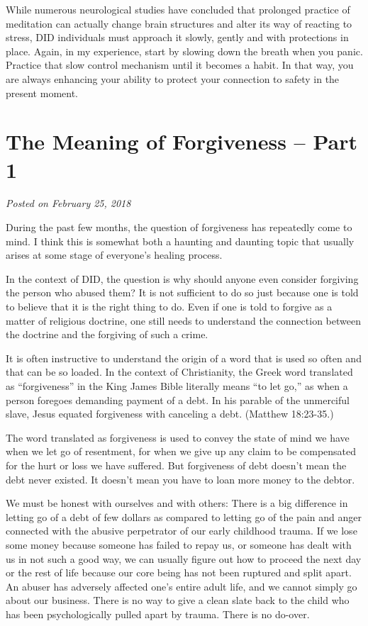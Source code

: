 \documentclass[]{book}
\begin{document}
While numerous neurological studies have concluded that prolonged practice of meditation can actually change brain structures and alter its way of reacting to stress, DID individuals must approach it slowly, gently and with protections in place. Again, in my experience, start by slowing down the breath when you panic. Practice that slow control mechanism until it becomes a habit. In that way, you are always enhancing your ability to protect your connection to safety in the present moment.

\hypertarget{the-meaning-of-forgiveness-part-1}{%
\section{The Meaning of Forgiveness -- Part 1}\label{the-meaning-of-forgiveness-part-1}}

\emph{Posted on February 25, 2018}

During the past few months, the question of forgiveness has repeatedly come to mind. I think this is somewhat both a haunting and daunting topic that usually arises at some stage of everyone's healing process.

In the context of DID, the question is why should anyone even consider forgiving the person who abused them? It is not sufficient to do so just because one is told to believe that it is the right thing to do. Even if one is told to forgive as a matter of religious doctrine, one still needs to understand the connection between the doctrine and the forgiving of such a crime.

It is often instructive to understand the origin of a word that is used so often and that can be so loaded. In the context of Christianity, the Greek word translated as ``forgiveness'' in the King James Bible literally means ``to let go,'' as when a person foregoes demanding payment of a debt. In his parable of the unmerciful slave, Jesus equated forgiveness with canceling a debt. (Matthew 18:23-35.)

The word translated as forgiveness is used to convey the state of mind we have when we let go of resentment, for when we give up any claim to be compensated for the hurt or loss we have suffered. But forgiveness of debt doesn't mean the debt never existed. It doesn't mean you have to loan more money to the debtor.

We must be honest with ourselves and with others: There is a big difference in letting go of a debt of few dollars as compared to letting go of the pain and anger connected with the abusive perpetrator of our early childhood trauma. If we lose some money because someone has failed to repay us, or someone has dealt with us in not such a good way, we can usually figure out how to proceed the next day or the rest of life because our core being has not been ruptured and split apart. An abuser has adversely affected one's entire adult life, and we cannot simply go about our business. There is no way to give a clean slate back to the child who has been psychologically pulled apart by trauma. There is no do-over.
\end{document}
